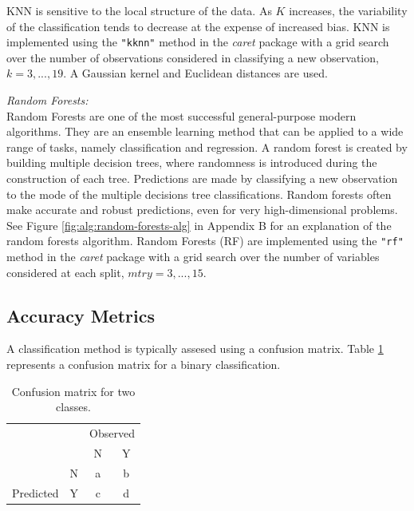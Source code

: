\documentclass[12pt,]{article}
\begin{document}
KNN is sensitive to the local structure of the data. As \(K\) increases,
the variability of the classification tends to decrease at the expense
of increased bias. KNN is implemented using the \texttt{"kknn"} method
in the \emph{caret} package with a grid search over the number of
observations considered in classifying a new observation,
\(k=3,...,19\). A Gaussian kernel and Euclidean distances are used.

\emph{Random Forests:}\\
Random Forests \autocite{breiman_random_2001} are one of the most
successful general-purpose modern algorithms\autocite{biau_random_2016}.
They are an ensemble learning method that can be applied to a wide range
of tasks, namely classification and regression. A random forest is
created by building multiple decision trees, where randomness is
introduced during the construction of each tree. Predictions are made by
classifying a new observation to the mode of the multiple decisions tree
classifications. Random forests often make accurate and robust
predictions, even for very high-dimensional
problems\autocite{biau_analysis_2012}. See Figure
\ref{fig:alg:random-forests-alg} in Appendix B for an explanation of the
random forests algorithm. Random Forests (RF) are implemented using the
\texttt{"rf"} method in the \emph{caret} package with a grid search over
the number of variables considered at each split, \(mtry=3,...,15\).

\subsection{Accuracy Metrics}\label{accuracy-metrics}

A classification method is typically assesed using a confusion matrix.
Table \ref{tab:confusion-matrix} represents a confusion matrix for a
binary classification.

\begin{table}[!h]

\caption{\label{tab:unnamed-chunk-1}\label{tab:confusion-matrix} Confusion matrix for two classes.}
\centering
\fontsize{12}{14}\selectfont
\begin{tabular}{lc|cc}
\toprule
\multicolumn{2}{c}{ } & \multicolumn{2}{c}{Observed} \\
\cmidrule(l{3pt}r{3pt}){3-4}
  &   & N & Y\\
\midrule
\rowcolor{gray!6}   & N & a & b\\

\multirow{-2}{*}{\raggedright\arraybackslash Predicted} & Y & c & d\\
\bottomrule
\end{tabular}
\end{table}
\end{document}
